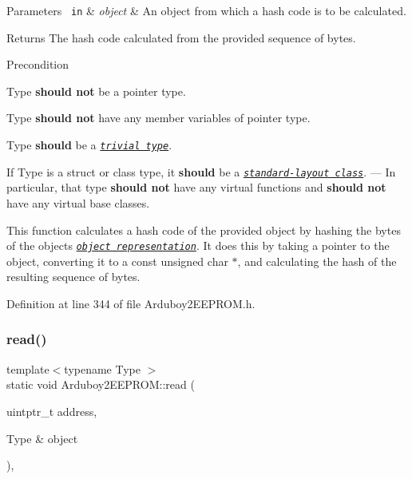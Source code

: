 \begin{DoxyParams}[1]{Parameters}
\mbox{\texttt{ in}}  & {\em object} & An object from which a hash code is to be calculated.\\
\hline
\end{DoxyParams}
\begin{DoxyReturn}{Returns}
The hash code calculated from the provided sequence of bytes.
\end{DoxyReturn}
\begin{DoxyPrecond}{Precondition}
\begin{DoxyItemize}
\item {\ttfamily Type} {\bfseries{should not}} be a pointer type. \item {\ttfamily Type} {\bfseries{should not}} have any member variables of pointer type. \item {\ttfamily Type} {\bfseries{should}} be a \href{https://en.cppreference.com/w/cpp/named_req/TrivialType}{\texttt{ {\itshape trivial type}}}. \item If {\ttfamily Type} is a {\ttfamily struct} or {\ttfamily class} type, it {\bfseries{should}} be a \href{https://en.cppreference.com/w/cpp/language/classes\#Standard-layout_class}{\texttt{ {\itshape standard-\/layout class}}}. --- In particular, that type {\bfseries{should not}} have any {\ttfamily virtual} functions and {\bfseries{should not}} have any {\ttfamily virtual} base classes.\end{DoxyItemize}
This function calculates a hash code of the provided {\ttfamily object} by hashing the bytes of the {\ttfamily object}\textquotesingle{}s \href{https://en.cppreference.com/w/cpp/language/object\#Object_representation_and_value_representation}{\texttt{ {\itshape object representation}}}. It does this by taking a pointer to the {\ttfamily object}, converting it to a {\ttfamily const unsigned char $\ast$}, and calculating the hash of the resulting sequence of bytes. 
\end{DoxyPrecond}


Definition at line 344 of file Arduboy2\+E\+E\+P\+R\+O\+M.\+h.

\mbox{\label{classArduboy2EEPROM_a6e9b09f0b94295c040204ca0cb674649}} 
\subsubsection{\texorpdfstring{read()}{read()}}
{\footnotesize\ttfamily template$<$typename Type $>$ \\
static void Arduboy2\+E\+E\+P\+R\+O\+M\+::read (\begin{DoxyParamCaption}\item[{uintptr\+\_\+t}]{address,  }\item[{Type \&}]{object }\end{DoxyParamCaption})\hspace{0.3cm}{\ttfamily [inline]}, {\ttfamily [static]}}



